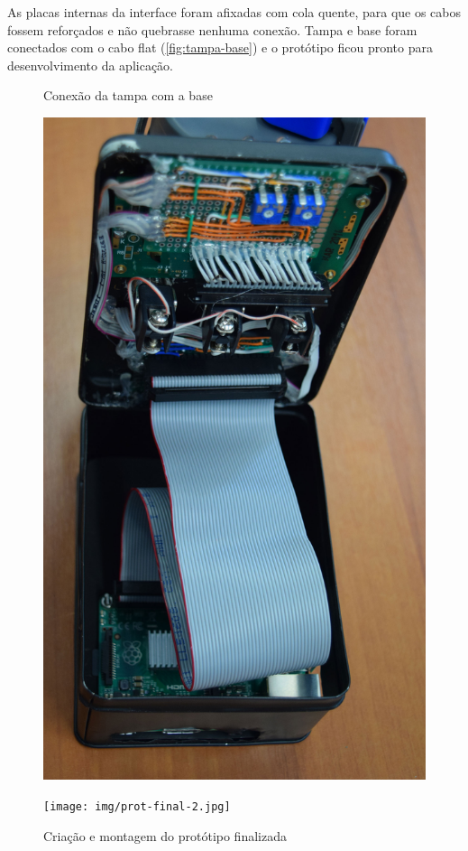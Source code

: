 \documentclass[
		12pt,				%
		openright,			%
		oneside,			%
		a4paper,			%
		chapter=TITLE,		%
		english,			%
		brazil				%
	]{abntex2}
\begin{document}
As placas internas da interface foram afixadas com cola quente, para que os cabos fossem reforçados e não quebrasse nenhuma conexão. Tampa e base foram conectados com o cabo flat (\autoref{fig:tampa-base}) e o protótipo ficou pronto para desenvolvimento da aplicação.

\begin{figure}[htb]
	\centering
 	\begin{minipage}{0.45\textwidth}
		\centering
		\caption{\label{fig:tampa-base}Conexão da tampa com a base}
		\includegraphics[width=1\textwidth]{img/tampa-base.jpg}
	\end{minipage}
	\hfill
	\begin{minipage}{0.45\textwidth}
		\centering
		\caption{\label{fig:prot-final}Criação e montagem do protótipo finalizada}
		\texttt{[image: img/prot-final-2.jpg]}
	\end{minipage}
\end{figure}
\end{document}
